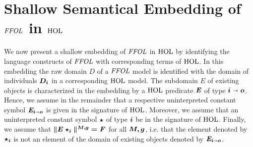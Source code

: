 \section{Shallow Semantical Embedding of $\mathit{FFOL}$ in $\text{\textrm{HOL}}$}
We now present a shallow embedding of $\mathit{FFOL}$ in $\text{\textrm{HOL}}$ by identifying
the language constructs of $\mathit{FFOL}$ with corresponding terms of $\text{\textrm{HOL}}$.
In this embedding the raw domain $D$ of a $\mathit{FFOL}$ model is
identified with the domain of individuals $\boldsymbol{D_i}$ in a corresponding $\text{\textrm{HOL}}$ model.  The subdomain $E$ of
existing objects is characterized in the embedding by a $\text{\textrm{HOL}}$
predicate $\boldsymbol{\mathit{E}}$ of type $\boldsymbol{ i\shortrightarrow o}$. Hence, we assume in the
remainder that a respective uninterpreted constant symbol
$\boldsymbol{\mathit{E}_{i\shortrightarrow o}}$
is given in the signature of $\text{\textrm{HOL}}$. Moreover, we assume that an
uninterpreted constant symbol $\boldsymbol{\star}$ of type $\boldsymbol{i}$ be in the
signature of $\text{\textrm{HOL}}$. Finally, we assume that $\boldsymbol{\|E \star_i\|^{M,g}=F}$ for
all $\boldsymbol{M,g}$, i.e. that the element denoted by $\boldsymbol{\star_i}$ is not
an element of the domain of existing objects denoted by
$\boldsymbol{\mathit{E}_{i\shortrightarrow o}}$.

